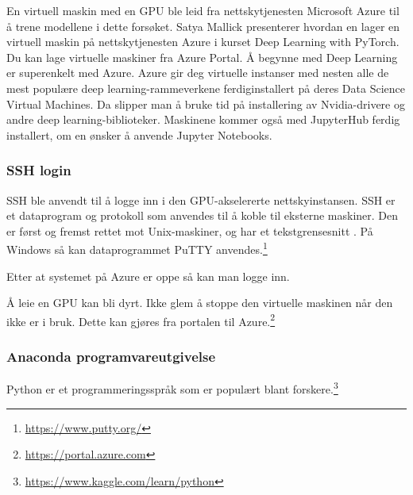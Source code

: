 En virtuell maskin med en GPU ble leid fra nettskytjenesten Microsoft Azure til å trene modellene i dette forsøket. Satya Mallick presenterer hvordan en lager en virtuell maskin på nettskytjenesten Azure i kurset Deep Learning with PyTorch. Du kan lage virtuelle maskiner fra Azure Portal. Å begynne med Deep Learning er superenkelt med Azure. Azure gir deg virtuelle instanser med nesten alle de mest populære deep learning-rammeverkene ferdiginstallert på deres Data Science Virtual Machines. Da slipper man å bruke tid på installering av Nvidia-drivere og andre deep learning-biblioteker. Maskinene kommer også med JupyterHub ferdig installert, om en ønsker å anvende Jupyter Notebooks. \cite{Mallick m.fl. 2020}


\subsubsection{SSH login}

SSH ble anvendt til å logge inn i den GPU-akselererte nettskyinstansen. SSH er et dataprogram og protokoll som anvendes til å koble til eksterne maskiner. Den er først og fremst rettet mot Unix-maskiner, og har et tekstgrensesnitt \cite{Mallick m.fl. 2020}. På Windows så kan dataprogrammet PuTTY anvendes.\footnote{\url{https://www.putty.org/}}

Etter at systemet på Azure er oppe så kan man logge inn.%

Å leie en GPU kan bli dyrt. Ikke glem å stoppe den virtuelle maskinen når den ikke er i bruk. Dette kan gjøres fra portalen til Azure.\footnote{\url{https://portal.azure.com}}


\subsubsection{Anaconda programvareutgivelse}

Python er et programmeringsspråk som er populært blant forskere.\footnote{\url{https://www.kaggle.com/learn/python}} \cite{Morris 2020}


